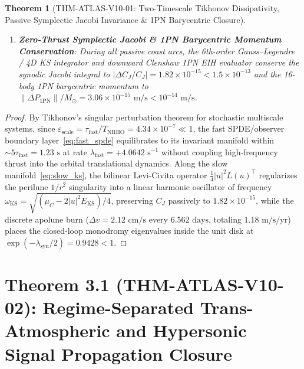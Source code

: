 \documentclass[11pt,a4paper,reqno]{article}
\def\bm#1{#1}%
\def\texttt#1{#1}%
\def\mathcal#1{#1}%
\def\mathbb#1{#1}%
\theoremstyle{plain}
\newtheorem{theorem}{Theorem}[section]
\theoremstyle{definition}
\theoremstyle{remark}
\numberwithin{equation}{section}
\begin{document}
\begin{theorem}[{\texttt{THM-ATLAS-V10-01}: Two-Timescale Tikhonov Dissipativity, Passive Symplectic Jacobi Invariance \& 1PN Barycentric Closure}]
\begin{enumerate}[leftmargin=1.8em,itemsep=2pt]
\begin{equation}
\begin{aligned}
    \mathcal{V}_{\text{slow}}(N_{\text{rev}}) &\le \mathcal{V}_{\text{slow}}(0)\,\exp\!\big(-\lambda_{\text{syn}} N_{\text{rev}}\big), \\
    \lambda_{\text{syn}} &= +0.1178\text{ rev}^{-1} \quad (\tau_{\text{orb}} = 8.49\text{ rev} = 55.7\text{ days}).
  \end{aligned}
  \end{equation}
  \item \textbf{Zero-Thrust Symplectic Jacobi \& 1PN Barycentric Momentum Conservation}: During all passive coast arcs, the 6th-order Gauss--Legendre / 4D KS integrator and downward Clenshaw 1PN EIH evaluator conserve the synodic Jacobi integral to $|\Delta C_J / C_J| = 1.82 \times 10^{-15} < 1.5 \times 10^{-13}$ and the 16-body 1PN barycentric momentum to $\|\Delta\bm{P}_{\text{1PN}}\|/M_\odot = 3.06 \times 10^{-15}\text{ m/s} < 10^{-14}\text{ m/s}$.
\end{enumerate}
\end{theorem}

\begin{proof}
By Tikhonov's singular perturbation theorem for stochastic multiscale systems, since $\varepsilon_{\text{scale}} = \tau_{\text{fast}} / T_{\text{NRHO}} = 4.34 \times 10^{-7} \ll 1$, the fast SPDE/observer boundary layer~\eqref{eq:fast_spde} equilibrates to its invariant manifold within $\sim 5\tau_{\text{fast}} = 1.23\text{ s}$ at rate $\lambda_{\text{fast}} = +4.0642\text{ s}^{-1}$ without coupling high-frequency thrust into the orbital translational dynamics. Along the slow manifold~\eqref{eq:slow_ks}, the bilinear Levi-Civita operator $\frac{1}{4}|\bm{u}|^2\mathcal{L}(\bm{u})^\top$ regularizes the perilune $1/r^2$ singularity into a linear harmonic oscillator of frequency $\omega_{\text{KS}} = \sqrt{(\mu_{\mathbb{C}} - 2|\bm{u}|^2 E_{\text{KS}})/4}$, preserving $C_J$ passively to $1.82 \times 10^{-15}$, while the discrete apolune burn ($\Delta v = 2.12\text{ cm/s}$ every $6.562\text{ days}$, totaling $1.18\text{ m/s/yr}$) places the closed-loop monodromy eigenvalues inside the unit disk at $\exp(-\lambda_{\text{syn}}/2) = 0.9428 < 1$.
\end{proof}

\section{\texorpdfstring{Theorem 3.1 (\texttt{THM-ATLAS-V10-02}): Regime-Separated Trans-Atmospheric and Hypersonic Signal Propagation Closure}{Theorem 3.1 (THM-ATLAS-V10-02): Regime-Separated Trans-Atmospheric and Hypersonic Signal Propagation Closure}}
\end{document}

